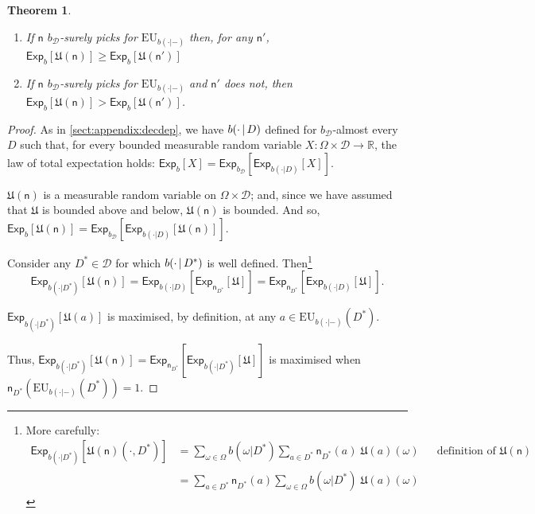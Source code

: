 \documentclass[a4paper,final]{article}
\newtheorem{theorem}{Theorem}[section]
\newcommand\Exp{\mathsf{Exp}}
\newcommand\EU{\mathrm{EU}}
\newcommand\U{\mathfrak{U}} %
\newcommand{\D}{\mathcal{D}}
\newcommand{\Decs}{\mathcal{D}}
\newcommand{\n}{\mathsf{n}}
\renewcommand{\nu}{\n}
\renewcommand{\Re}{\mathbb{R}}
\newcommand\SetDelimiter[1][]{
	\nonscript\,#1\vert \allowbreak \nonscript\,\mathopen{}}
\providecommand\given{\SetDelimiter}
\renewcommand{\geq}{\geqslant}
\newenvironment{CCM rewritten}
{\begingroup\color{blue}} %
{\endgroup}              %
\begin{document}
\begin{theorem}\label{thm:EU-appendix} 
	\hspace*{1mm}
	\begin{enumerate}[label=\normalfont(\roman*), ref=\roman*]
		\item  If $\n$ $b_\Decs$-surely picks for $\EU_{b(\cdot|-)}$ then, for any $\n'$, $\Exp_b[\U(\n)]\geq\Exp_b[\U(\n')]$
		\item  If $\n$ $b_\Decs$-surely picks for $\EU_{b(\cdot|-)}$ and $\n'$ does not, then $\Exp_b[\U(\n)]>\Exp_b[\U(\n')]$.
	\end{enumerate}
\end{theorem}
\begin{proof}


As in \cref{sect:appendix:decdep}, we have $b(\cdot\given D)$ defined for $b_\Decs$-almost every $D$ such that, for every bounded measurable random variable $X:\Omega\times\Decs\to\Re$, the law of total expectation holds: $\Exp_b[X]=\Exp_{b_\Decs}[\Exp_{b(\cdot|D)}[X]]$.

$\U(\n)$ is a measurable random variable on $\Omega\times\Decs$; and, since we have assumed that $\U$ is bounded above and below, $\U(\n)$ is bounded. And so, $\Exp_{b}[\U(\n)]=\Exp_{b_\Decs}[\Exp_{b(\cdot | D)}[\U(\n)]]$. 


Consider any $D^*\in\D$ for which $b(\cdot\given D^*)$ is well defined. Then\footnote{More carefully:
	\begin{align}
		\Exp_{b(\cdot | D^*)}[\U(\n)(\cdot,D^*)]&=	\sum_{\omega\in\Omega}b(\omega| D^*)\sum_{a\in D^*}\n_{D^*}(a)\; \U(a)(\omega)&&\text{definition of $\U(\n)$}\\
		&=\sum_{a\in D^*}\n_{D^*}(a)\sum_{\omega\in\Omega}b(\omega| D^*)\;\U(a)(\omega)
\end{align}	}
 $$\Exp_{b(\cdot | D^*)}[\U(\n)]=\Exp_{b(\cdot | D)}[\Exp_{\nu_{D^*}}[\U]]=\Exp_{\nu_{D^*}}[\Exp_{b(\cdot | D)}[\U]].$$

$\Exp_{b(\cdot | D^*)}[\U(a)]$ is maximised, by definition, at any $a\in \EU_{b(\cdot|-)}(D^*)$. 

Thus, $\Exp_{b(\cdot | D^*)}[\U(\n)]=\Exp_{\nu_{D^*}}[\Exp_{b(\cdot | D^*)}[\U]]$ is maximised when $\n_{D^*}(\EU_{b(\cdot|-)}(D^*))=1$. 


\end{proof}
\end{document}

